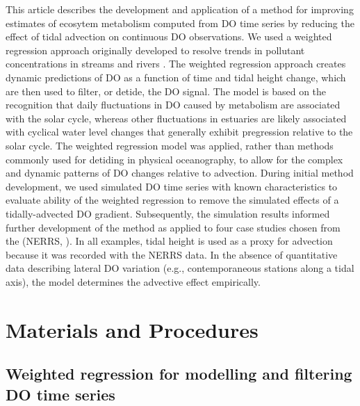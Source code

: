 \documentclass[letterpaper,12pt,oneside]{article}\usepackage[]{graphicx}\usepackage[]{color}
\begin{document}
This article describes the development and application of a method for improving estimates of ecosytem metabolism computed from \ac{DO} time series by reducing the effect of tidal advection on continuous \ac{DO} observations.  We used a weighted regression approach originally developed to resolve trends in pollutant concentrations in streams and rivers \citep{Hirsch10}.  The weighted regression approach creates dynamic predictions of \ac{DO} as a function of time and tidal height change, which are then used to filter, or detide, the \ac{DO} signal.  The model is based on the recognition that daily fluctuations in \ac{DO} caused by metabolism are associated with the solar cycle, whereas other fluctuations in estuaries are likely associated with cyclical water level changes that generally exhibit pregression relative to the solar cycle.  The weighted regression model was applied, rather than methods commonly used for detiding in physical oceanography, to allow for the complex and dynamic patterns of \ac{DO} changes relative to advection.  During initial method development, we used simulated \ac{DO} time series with known characteristics to evaluate ability of the weighted regression to remove the simulated effects of a tidally-advected \ac{DO} gradient.  Subsequently, the simulation results informed further development of the method as applied to four case studies chosen from the  (\acs{NERRS}, \citealt{Wenner04}).  In all examples, tidal height is used as a proxy for advection because it was recorded with the \ac{NERRS} data.  In the absence of quantitative data describing lateral \ac{DO} variation (e.g., contemporaneous stations along a tidal axis), the model determines the advective effect empirically.

\section{Materials and Procedures}

\subsection{Weighted regression for modelling and filtering \ac{DO} time series}
\end{document}
